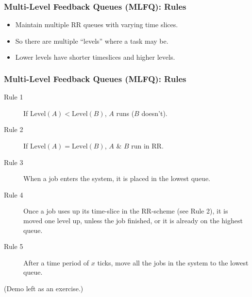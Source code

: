 \begin{frame}

\frametitle{Multi-Level Feedback Queues (MLFQ): Rules}

\begin{itemize}

\item Maintain multiple RR queues with varying time slices.

\item So there are multiple ``levels'' where a task may be.

\item Lower levels have shorter timeslices and higher levels.


\end{itemize}

\end{frame}

\begin{frame}

\frametitle{Multi-Level Feedback Queues (MLFQ): Rules}

\begin{description}

\item [Rule 1] If $\text{Level}(A) < \text{Level}(B)$, $A$ runs ($B$ doesn't).

\item [Rule 2] If $\text{Level}(A) = \text{Level}(B)$, $A$ \& $B$ run in RR. \\

\item [Rule 3] When a job enters the system, it is placed in the lowest queue.

\item [Rule 4] Once a job uses up its time-slice in the RR-scheme (see Rule 2),
it is moved one level up, unless the job finished, or it is already on the
highest queue.

\item [Rule 5] After a time period of $x$ ticks, move all the jobs in the
system to the lowest queue.

\end{description}

\begin{center}

(Demo left as an exercise.)

\end{center}

\end{frame}
